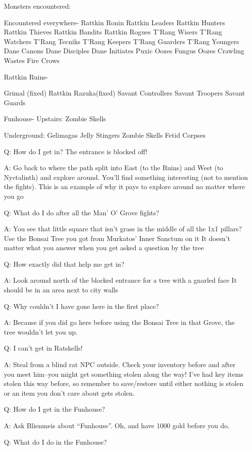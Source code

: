 \documentclass[12pt]{article}
\begin{document}
Monsters encountered:

Encountered everywhere- Rattkin Ronin Rattkin Leaders Rattkin Hunters
Rattkin Thieves Rattkin Bandits Rattkin Rogues T'Rang Wisers T'Rang
Watchers T'Rang Tecniks T'Rang Keepers T'Rang Guarders T'Rang Youngers
Dane Canons Dane Disciples Dane Initiates Puxic Oozes Fungus Oozes
Crawling Wastes Fire Crows

Rattkin Ruins-

Grimal (fixed) Rattkin Razuka(fixed) Savant Controllers Savant Troopers
Savant Guards

Funhouse- Upstairs: Zombie Skells

Underground: Gelimagas Jelly Stingers Zombie Skells Fetid Corpses

Q: How do I get in? The entrance is blocked off!

A: Go back to where the path split into East (to the Ruins) and West (to
Nyctalinth) and explore around. You'll find something interesting (not
to mention the fights). This is an example of why it pays to explore
around no matter where you go

Q: What do I do after all the Man' O' Grove fights?

A: You see that little square that isn't grass in the middle of all the
1x1 pillars? Use the Bonsai Tree you got from Murkatos' Inner Sanctum on
it It doesn't matter what you answer when you get asked a question by
the tree

Q: How exactly did that help me get in?

A: Look around north of the blocked entrance for a tree with a gnarled
face It should be in an area next to city walls

Q: Why couldn't I have gone here in the first place?

A: Because if you did go here before using the Bonsai Tree in that
Grove, the tree wouldn't let you up.

Q: I can't get in Ratskells!

A: Steal from a blind rat NPC outside. Check your inventory before and
after you meet him--you might get something stolen along the way! I've
had key items stolen this way before, so remember to save/restore until
either nothing is stolen or an item you don't care about gets stolen.

Q: How do I get in the Funhouse?

A: Ask Blienmeis about ``Funhouse''. Oh, and have 1000 gold before you
do.

Q: What do I do in the Funhouse?
\end{document}
